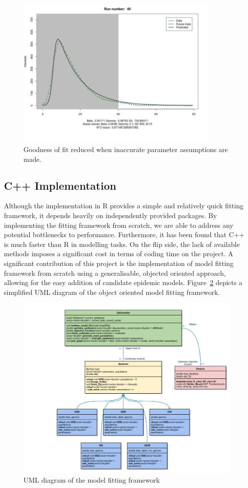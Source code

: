 \begin{figure}
  \centering
\includegraphics[width=10cm]{images/siri0_unknown}
\caption{Goodness of fit reduced when inaccurate parameter assumptions
  are made.}

\label{fig:siri0wrong}
\end{figure}

\subsection{C++ Implementation}
Although the implementation in R provides a simple and relatively quick
fitting framework, it depends heavily on independently provided
packages. By implementing the fitting framework from scratch, we are
able to address any potential bottlenecks to performance. Furthermore,
it has been found that C++ is much faster than R in modelling
tasks.\cite{languagespeeds} On the flip
side, the lack of available methods imposes a significant cost in
terms of coding time on the project. A significant contribution of this project
is the implementation of model fitting framework from scratch using a
generalisable, objected oriented approach, allowing for the easy
addition of candidate epidemic models. Figure~\ref{fig:uml}  depicts a simplified
UML diagram of the object oriented model fitting framework.


\begin{figure}
  \centering
 \includegraphics[width=15cm]{images/uml}
\caption{UML diagram of the model fitting framework}
\label{fig:uml}
\end{figure}

